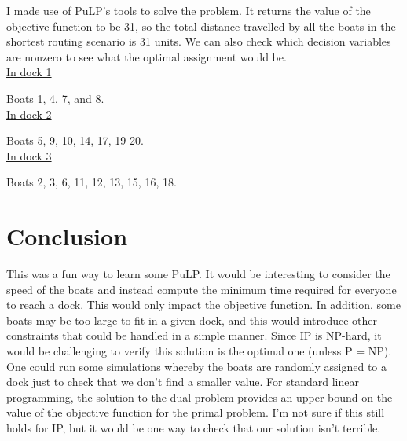 \documentclass[12pt,english]{article}
\begin{document}
I made use of PuLP's tools to solve the problem.  It returns the value of the objective function to be 31, so the total distance travelled by all the boats in the shortest routing scenario is 31 units.  We can also check which decision variables are nonzero to see what the optimal assignment would be. \\


\underline{In dock 1}

Boats 1, 4, 7, and 8. \\

\underline{In dock 2}

Boats 5, 9, 10, 14, 17, 19 20. \\

\underline{In dock 3}

Boats 2, 3, 6, 11, 12, 13, 15, 16, 18. \\

\section{Conclusion}

This was a fun way to learn some PuLP.  It would be interesting to consider the speed of the boats and instead compute the minimum time required for everyone to reach a dock.  This would only impact the objective function.  In addition, some boats may be too large to fit in a given dock, and this would introduce other constraints that could be handled in a simple manner.  Since IP is NP-hard, it would be challenging to verify this solution is the optimal one (unless P = NP).  One could run some simulations whereby the boats are randomly assigned to a dock just to check that we don't find a smaller value.  For standard linear programming, the solution to the dual problem provides an upper bound on the value of the objective function for the primal problem.  I'm not sure if this still holds for IP, but it would be one way to check that our solution isn't terrible.
\end{document}
